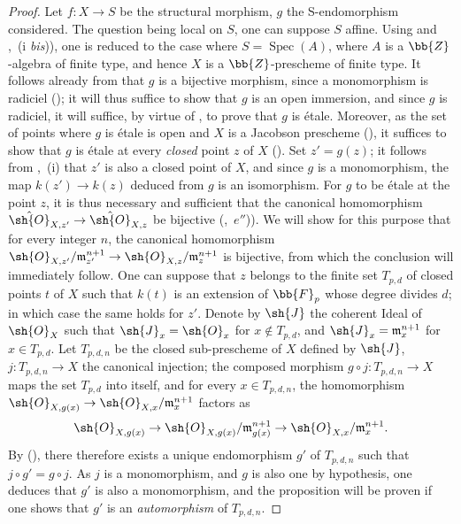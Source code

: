 \begin{proof}
Let $f:X\to S$ be the structural morphism, $g$ the S-endomorphism considered.
The question being local on $S$, one can suppose $S$ affine.
Using  and ,~(i \emph{bis})), one is reduced to the case where $S=\operatorname{Spec}(A)$, where $A$ is a $\bb{Z}$-algebra of finite type, and hence $X$ is a $\bb{Z}$-prescheme of finite type.
It follows already from  that $g$ is a bijective morphism, since a monomorphism is radiciel (); it will thus suffice to show that $g$ is an open immersion, and since $g$ is radiciel, it will suffice, by virtue of , to prove that $g$ is \'etale.
Moreover, as the set of points where $g$ is \'etale is open and $X$ is a Jacobson prescheme (), it suffices to show that $g$ is \'etale at every \emph{closed} point $z$ of $X$ ().
Set $z'=g(z)$; it follows from ,~(i) that $z'$ is also a closed point of $X$, and since $g$ is a monomorphism, the map $k(z')\to k(z)$ deduced from $g$ is an isomorphism.
For $g$ to be \'etale at the point $z$, it is thus necessary and sufficient that the canonical homomorphism $\hat{\sh{O}}_{X,z'}\to\hat{\sh{O}}_{X,z}$ be bijective (,~$e''$)).
We will show for this purpose that for every integer $n$, the canonical homomorphism $\sh{O}_{X,z'}/\mathfrak{m}_{z'}^{n+1}\to\sh{O}_{X,z}/\mathfrak{m}_z^{n+1}$ is bijective, from which the conclusion will immediately follow.
One can suppose that $z$ belongs to the finite set $T_{p,d}$ of closed points $t$ of $X$ such that $k(t)$ is an extension of $\bb{F}_p$ whose degree divides $d$; in which case the same holds for $z'$.
Denote by $\sh{J}$ the coherent Ideal of $\sh{O}_X$ such that $\sh{J}_x=\sh{O}_x$ for $x\notin T_{p,d}$, and $\sh{J}_x=\mathfrak{m}_x^{n+1}$ for $x\in T_{p,d}$.
Let $T_{p,d,n}$ be the closed sub-prescheme of $X$ defined by $\sh{J}$, $j:T_{p,d,n}\to X$ the canonical injection; the composed morphism $g\circ j:T_{p,d,n}\to X$ maps the set $T_{p,d}$ into itself, and for every $x\in T_{p,d,n}$, the homomorphism $\sh{O}_{X,g(x)}\to\sh{O}_{X,x}/\mathfrak{m}_x^{n+1}$ factors as
\[
  \sh{O}_{X,g(x)} \to \sh{O}_{X,g(x)}/\mathfrak{m}_{g(x)}^{n+1} \to \sh{O}_{X,x}/\mathfrak{m}_x^{n+1}.
\]
By (), there therefore exists a unique endomorphism $g'$ of $T_{p,d,n}$ such that $j\circ g'=g\circ j$.
As $j$ is a monomorphism, and $g$ is also one by hypothesis, one deduces that $g'$ is also a monomorphism, and the proposition will be proven if one shows that $g'$ is an \emph{automorphism} of $T_{p,d,n}$.

\end{proof}
